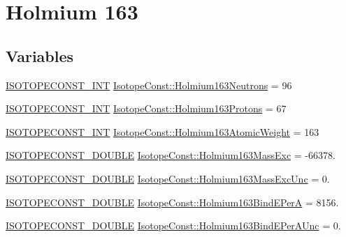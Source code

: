 \hypertarget{group___isotope_const-_holmium-_ho163}{}\section{Holmium 163}
\label{group___isotope_const-_holmium-_ho163}
\subsection*{Variables}
\begin{DoxyCompactItemize}
\item 
\mbox{\hyperlink{group___isotope_const-_macros_ga5f18360b3e99483a35c32d789e62621c}{I\+S\+O\+T\+O\+P\+E\+C\+O\+N\+S\+T\+\_\+\+I\+NT}} \mbox{\hyperlink{group___isotope_const-_holmium-_ho163_gafb8da376503576f9276eef592986340f}{Isotope\+Const\+::\+Holmium163\+Neutrons}} = 96
\item 
\mbox{\hyperlink{group___isotope_const-_macros_ga5f18360b3e99483a35c32d789e62621c}{I\+S\+O\+T\+O\+P\+E\+C\+O\+N\+S\+T\+\_\+\+I\+NT}} \mbox{\hyperlink{group___isotope_const-_holmium-_ho163_ga25b363aca6dc8c0ca83f71aaba56dc26}{Isotope\+Const\+::\+Holmium163\+Protons}} = 67
\item 
\mbox{\hyperlink{group___isotope_const-_macros_ga5f18360b3e99483a35c32d789e62621c}{I\+S\+O\+T\+O\+P\+E\+C\+O\+N\+S\+T\+\_\+\+I\+NT}} \mbox{\hyperlink{group___isotope_const-_holmium-_ho163_ga4e852a5939168c740ebbea155d9e8799}{Isotope\+Const\+::\+Holmium163\+Atomic\+Weight}} = 163
\item 
\mbox{\hyperlink{group___isotope_const-_macros_ga8f45a7272ce02c0b4c65c44636ed719a}{I\+S\+O\+T\+O\+P\+E\+C\+O\+N\+S\+T\+\_\+\+D\+O\+U\+B\+LE}} \mbox{\hyperlink{group___isotope_const-_holmium-_ho163_gab488246a4c624e7f7ef2ad326f2f2139}{Isotope\+Const\+::\+Holmium163\+Mass\+Exc}} = -\/66378.
\item 
\mbox{\hyperlink{group___isotope_const-_macros_ga8f45a7272ce02c0b4c65c44636ed719a}{I\+S\+O\+T\+O\+P\+E\+C\+O\+N\+S\+T\+\_\+\+D\+O\+U\+B\+LE}} \mbox{\hyperlink{group___isotope_const-_holmium-_ho163_gabdd592a97084e3bbf3ead5ec9bc247b6}{Isotope\+Const\+::\+Holmium163\+Mass\+Exc\+Unc}} = 0.
\item 
\mbox{\hyperlink{group___isotope_const-_macros_ga8f45a7272ce02c0b4c65c44636ed719a}{I\+S\+O\+T\+O\+P\+E\+C\+O\+N\+S\+T\+\_\+\+D\+O\+U\+B\+LE}} \mbox{\hyperlink{group___isotope_const-_holmium-_ho163_ga9c9a43bd84ea049237ea632d722aad0b}{Isotope\+Const\+::\+Holmium163\+Bind\+E\+PerA}} = 8156.
\item 
\mbox{\hyperlink{group___isotope_const-_macros_ga8f45a7272ce02c0b4c65c44636ed719a}{I\+S\+O\+T\+O\+P\+E\+C\+O\+N\+S\+T\+\_\+\+D\+O\+U\+B\+LE}} \mbox{\hyperlink{group___isotope_const-_holmium-_ho163_gad997edc12085562422362192a3ecd8f2}{Isotope\+Const\+::\+Holmium163\+Bind\+E\+Per\+A\+Unc}} = 0.

\end{DoxyCompactItemize}
